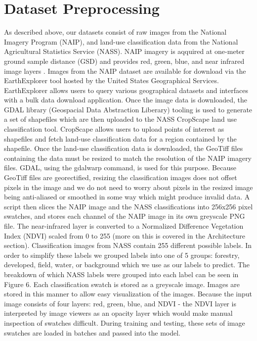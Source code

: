 \documentclass[12pt]{article}
\begin{document}
\section{Dataset Preprocessing}
As described above, our datasets consist of raw images from the National Imagery Program (NAIP), and land-use classification data from the National Agricultural Statistics Service (NASS). NAIP imagery is aqquired at one-meter ground sample distance (GSD) and provides red, green, blue, and near infrared image layers \cite{NAIP}. Images from the NAIP dataset are available for download via the EarthExplorer tool hosted by the United States Geographical Services. EarthExplorer allows users to query various geographical datasets and interfaces with a bulk data download application. Once the image data is downloaded, the GDAL library (Geospacial Data Abstraction Liberary) tooling is used to generate a set of shapefiles which are then uploaded to the NASS CropScape land use classification tool. CropScape allows users to upload points of interest as shapefiles and fetch land-use classification data for a region contained by the shapefile. Once the land-use classification data is downloaded, the GeoTiff files containing the data must be resized to match the resolution of the NAIP imagery files. GDAL, using the gdalwarp command, is used for this purpose. Because GeoTiff files are georectified, resizing the classification images does not offset pixels in the image and we do not need to worry about pixels in the resized image being anti-aliased or smoothed in some way which might produce invalid data. A script then slices the NAIP image and the NASS classifications into 256x256 pixel swatches, and stores each channel of the NAIP image in its own greyscale PNG file. The near-infrared layer is converted to a Normalized Difference Vegetation Index (NDVI) scaled from 0 to 255 (more on this is covered in the Architecture section). Classification images from NASS contain 255 different possible labels. In order to simplify these labels we grouped labels into one of 5 groups: forestry, developed, field, water, or background which we use as our labels to predict. The breakdown of which NASS labels were grouped into each label can be seen in Figure 6. Each classification swatch is stored as a greyscale image. Images are stored in this manner to allow easy visualization of the images. Because the input image consists of four layers: red, green, blue, and NDVI - the NDVI layer is interpreted by image viewers as an opacity layer which would make manual inspection of swatches difficult. During training and testing, these sets of image swatches are loaded in batches and passed into the model.
\end{document}
